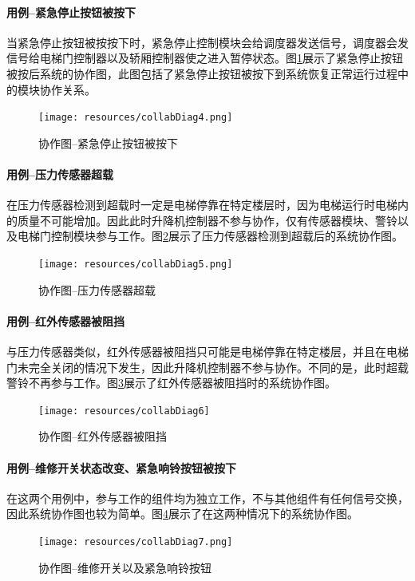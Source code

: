 \begin{minipage}{\textwidth}
\paragraph{用例--紧急停止按钮被按下}
当紧急停止按钮被按按下时，紧急停止控制模块会给调度器发送信号，调度器会发信号给电梯门控制器以及轿厢控制器使之进入暂停状态。图\ref{fig:collabDiag4}展示了紧急停止按钮被按后系统的协作图，此图包括了紧急停止按钮被按下到系统恢复正常运行过程中的模块协作关系。

\begin{figure}[H]
	\centering
	\texttt{[image: resources/collabDiag4.png]}
	\caption{协作图--紧急停止按钮被按下}
	\label{fig:collabDiag4}
\end{figure}
\end{minipage}

\begin{minipage}{\textwidth}
\paragraph{用例--压力传感器超载}
在压力传感器检测到超载时一定是电梯停靠在特定楼层时，因为电梯运行时电梯内的质量不可能增加。因此此时升降机控制器不参与协作，仅有传感器模块、警铃以及电梯门控制模块参与工作。图\ref{fig:collabDiag5}展示了压力传感器检测到超载后的系统协作图。

\begin{figure}[H]
	\centering
	\texttt{[image: resources/collabDiag5.png]}
	\caption{协作图--压力传感器超载}
	\label{fig:collabDiag5}
\end{figure}
\end{minipage}

\begin{minipage}{\textwidth}
\paragraph{用例--红外传感器被阻挡}
与压力传感器类似，红外传感器被阻挡只可能是电梯停靠在特定楼层，并且在电梯门未完全关闭的情况下发生，因此升降机控制器不参与协作。不同的是，此时超载警铃不再参与工作。图\ref{fig:collabDiag6}展示了红外传感器被阻挡时的系统协作图。

\begin{figure}[H]
	\centering
	\texttt{[image: resources/collabDiag6]}
	\caption{协作图--红外传感器被阻挡}
	\label{fig:collabDiag6}
\end{figure}
\end{minipage}

\begin{minipage}{\textwidth}
\paragraph{用例--维修开关状态改变、紧急响铃按钮被按下}
在这两个用例中，参与工作的组件均为独立工作，不与其他组件有任何信号交换，因此系统协作图也较为简单。图\ref{fig:collabDiag7}展示了在这两种情况下的系统协作图。
\begin{figure}[H]
	\centering
	\texttt{[image: resources/collabDiag7.png]}
	\caption{协作图--维修开关以及紧急响铃按钮}
	\label{fig:collabDiag7}
\end{figure}
\end{minipage}

